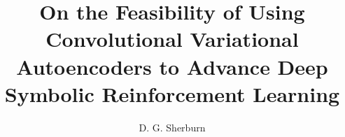 \documentclass[a4paper,12pt,twoside]{report}
\begin{document}
\title{\LARGE {\bf On the Feasibility of Using Convolutional Variational Autoencoders to Advance Deep Symbolic Reinforcement Learning}\\
 \vspace*{6mm}
}

\author{D. G. Sherburn}

\normallinespacing
\maketitle

\preface




\body






\appendix




\end{document}
